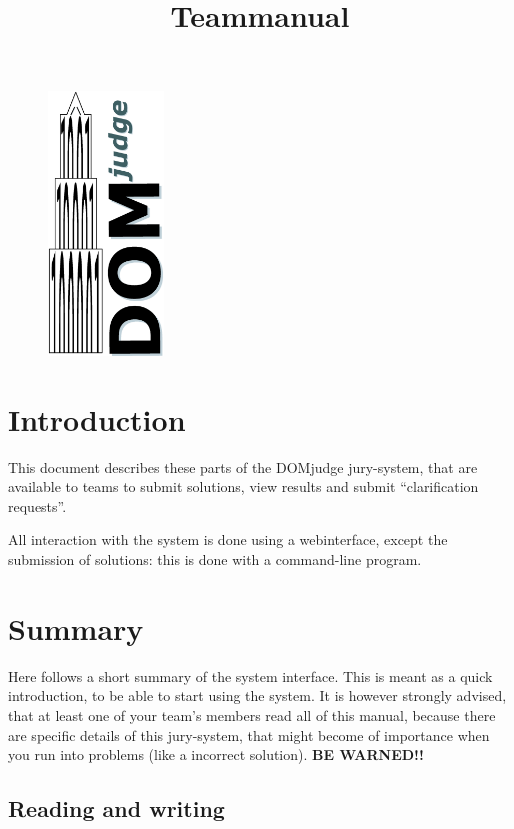 \documentclass[11pt,a4paper]{article}
\title{Teammanual \DOMjudge}
\newcommand{\DOMjudge}{\textsc{DOM}judge }
\begin{document}
\begin{titlepage}
\maketitle
\vspace{1cm}
\begin{figure}[htbp]
\centerline{\includegraphics[height=7cm]{logos/DOMjudgelogo.eps}}
\end{figure}
\end{titlepage}

\newpage
\tableofcontents

\newpage
\section{Introduction}

This document describes these parts of the \DOMjudge jury-system, that
are available to teams to submit solutions, view results and submit
``clarification requests''.

All interaction with the system is done using a webinterface, except
the submission of solutions: this is done with a command-line program.

\section{Summary}

Here follows a short summary of the system interface. This is meant as
a quick introduction, to be able to start using the system. It is
however strongly advised, that at least one of your team's members
read all of this manual, because there are specific details of this
jury-system, that might become of importance when you run into
problems (like a incorrect solution). \textbf{BE WARNED!!}

\subsection{Reading and writing}
\end{document}
